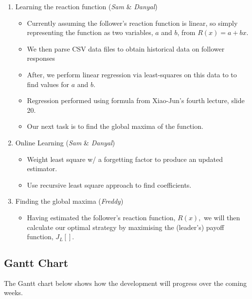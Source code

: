 \documentclass[10pt,a4paper]{report}
\begin{document}
\begin{enumerate}
  \item Learning the reaction function (\emph{Sam} \& \emph{Danyal})
    \begin{itemize}
      \item Currently assuming the follower's reaction function is linear, so simply representing the function as two variables, $a$ and $b$, from $R(x) = a + bx$.
      \item We then parse CSV data files to obtain historical data on follower responses
      \item After, we perform linear regression via least-squares on this data to to find values for $a$ and $b$.
      \item Regression performed using formula from Xiao-Jun's fourth lecture, slide 20.
      \item Our next task is to find the global maxima of the function.
    \end{itemize}
  \item{Online Learning (\emph{Sam} \& \emph{Danyal})}
    \begin{itemize}
      \item Weight least square w/ a forgetting factor to produce an updated estimator.
      \item Use recursive least square approach to find coefficients.
    \end{itemize}

  \item Finding the global maxima (\emph{Freddy})
    \begin{itemize}
      \item Having estimated the follower's reaction function, $R(x),$ we will then calculate our optimal strategy by maximising the (leader's) payoff function, $J_L[]$.
    \end{itemize}
\end{enumerate}

\newpage

\subsection{Gantt Chart}
The Gantt chart below shows how the development will progress over the coming weeks.
\end{document}
